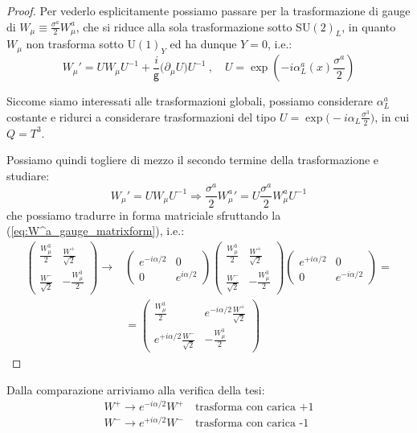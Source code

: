 \documentclass[../main.tex]{subfiles}
\begin{document}
\begin{proof}
    Per vederlo esplicitamente possiamo passare per la trasformazione di gauge di $W_\mu \equiv \frac{\sigma^a}{2} W_\mu^a$, che si riduce alla sola trasformazione sotto SU$(2)_L$, in quanto $W_\mu$ non trasforma sotto U$(1)_Y$ ed ha dunque $Y=0$, i.e.:
    \[
    W_\mu' = U W_\mu U^{-1} +\frac{i}{\mathsf g}\big(\partial_\mu U\big)U^{-1} ~,\quad U = \exp(-i\alpha_L^a(x)\frac{\sigma^a}{2})
    \]

    Siccome siamo interessati alle trasformazioni globali, possiamo considerare $\alpha_L^a$ costante e ridurci a considerare trasformazioni del tipo $U = \exp\big(-i\alpha_L\frac{\sigma^3}{2}\big)$, in cui $Q=T^3$.

    Possiamo quindi togliere di mezzo il secondo termine della trasformazione e studiare:
    \[
    W_\mu' = U W_\mu U^{-1} \Rightarrow \frac{\sigma^a}{2} {W_\mu^a}'= U \frac{\sigma^a}{2} W_\mu^a U^{-1}
    \]
    che possiamo tradurre in forma matriciale sfruttando la (\ref{eq:W^a_gauge_matrixform}), i.e.: 
    \begin{align*}
        \begin{pmatrix}
            \frac{W_\mu^3}{2}    &     \frac{W^+}{\sqrt2} \\
            \frac{W^-}{\sqrt2}   &  -\frac{W_\mu^3}{2}
        \end{pmatrix}
        \rightarrow &
        \begin{pmatrix}
            e^{-i\alpha/2}    &     0 \\
            0                 &  e^{i\alpha/2}
        \end{pmatrix}
        \begin{pmatrix}
            \frac{W_\mu^3}{2}    &     \frac{W^+}{\sqrt2} \\
            \frac{W^-}{\sqrt2}   &  -\frac{W_\mu^3}{2}
        \end{pmatrix}
        \begin{pmatrix}
            e^{+i\alpha/2}    &     0 \\
            0                 &  e^{-i\alpha/2}
        \end{pmatrix} =\\
        &= 
        \begin{pmatrix}
            \frac{W_\mu^3}{2}    &     e^{-i\alpha/2}\frac{W^+}{\sqrt2} \\
           e^{+i\alpha/2} \frac{W^-}{\sqrt2}   &  -\frac{W_\mu^3}{2}
        \end{pmatrix}
    \end{align*}
\end{proof}
Dalla comparazione arriviamo alla verifica della tesi:
\begin{equation}
    \boxed{\begin{aligned}
        W^+ \rightarrow e^{-i\alpha/2}W^+ \quad \text{trasforma con carica +1}\\
        W^- \rightarrow e^{+i\alpha/2}W^-\quad \text{trasforma con carica -1}
    \end{aligned}}
    \label{eq:U1_EM_W+-_charges}
\end{equation}
\end{document}
